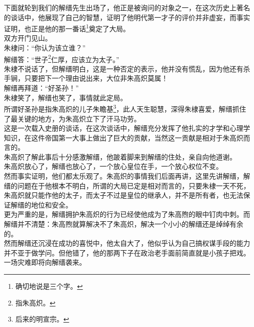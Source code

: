 \begin{multicols}{\theparacolNo}
下面就轮到我们的解缙先生出场了，他正是被询问的对象之一，在这次历史上著名的谈话中，他展现了自己的智慧，证明了他明代第一才子的评价并非虚妄，而事实证明，也正是他的那一番话\footnote{确切地说是三个字。}奠定了大局。\\

双方开门见山。\\

朱棣问：“你认为该立谁？”\\

解缙答：“世子\footnote{指朱高炽。}仁厚，应该立为太子。”\\

朱棣不说话了，但解缙明白，这是一种否定的表示，他并没有慌乱，因为他还有杀手锏，只要把下一个理由说出来，大位非朱高炽莫属！\\

解缙再拜道：“好圣孙！”\\

朱棣笑了，解缙也笑了，事情就此定局。\\

所谓好圣孙是指朱高炽的儿子朱瞻基\footnote{后来的明宣宗。}，此人天生聪慧，深得朱棣喜爱，解缙抓住了最关键的地方，为朱高炽立下了汗马功劳。\\

这是一次载入史册的谈话，在这次谈话中，解缙充分发挥了他扎实的才学和心理学知识，在这件帝国第一大事上做出了巨大的贡献，当然这一贡献是相对于朱高炽而言的。\\

朱高炽了解此事后十分感激解缙，他跛着脚来到解缙的住处，亲自向他道谢。\\

朱高炽放心了，解缙也放心了，一个放心皇位在手，一个放心权位不变。\\

然而事实证明，他们都太乐观了。朱高炽的事情我们后面再讲，这里先讲解缙，解缙的问题在于他根本不明白，所谓的大局已定是相对而言的，只要朱棣一天不死，朱高炽就只能作他的太子，而太子不过是皇位的继承人，并不是所有者，也无法保证解缙的地位和安全。\\

更为严重的是，解缙拥护朱高炽的行为已经使他成为了朱高煦的眼中钉肉中刺。而解缙并不清楚：朱高煦就算解决不了朱高炽，解决一个小小的解缙还是绰绰有余的。\\

然而解缙还沉浸在成功的喜悦中，他太自大了，他似乎认为自己搞权谋手段的能力并不亚于做学问。但他错了，他的那两下子在政治老手面前简直就是小孩子把戏。一场灾难即将向解缙袭来。\\


\end{multicols}
